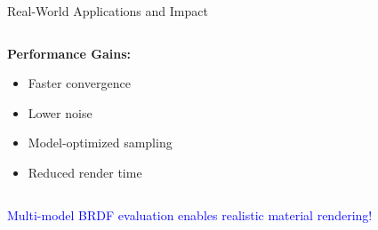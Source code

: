 \documentclass[aspectratio=169]{beamer}
\begin{document}
\begin{frame}{Real-World Applications and Impact}
\begin{columns}
\begin{column}{0.4\textwidth}
            \vspace{0.5cm}
            \textbf{Performance Gains:}
            \begin{itemize}
                \item Faster convergence
                \item Lower noise
                \item Model-optimized sampling
                \item Reduced render time
            \end{itemize}
        \end{column}
    \end{columns}
    
    \vspace{0.5cm}
    \begin{center}
        \textcolor{blue}{\large Multi-model BRDF evaluation enables realistic material rendering!}
    \end{center}
\end{frame}
\end{document}
